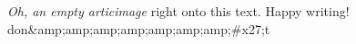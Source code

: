 \textit{Oh, an empty articimage} right onto this text. Happy writing! 
don&amp;amp;amp;amp;amp;amp;amp;#x27;t